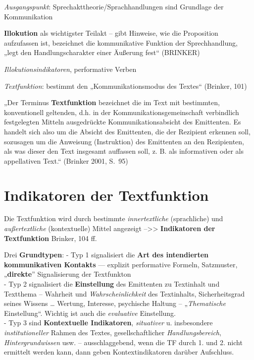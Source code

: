 \documentclass[
  letterpaper,
]{scrbook}
\begin{document}
\emph{Ausgangspunkt}: Sprechakttheorie/Sprachhandlungen sind Grundlage
der Kommunikation

\textbf{Illokution} als wichtigster Teilakt -- gibt Hinweise, wie die
Proposition aufzufassen ist, bezeichnet die kommunikative Funktion der
Sprechhandlung, „legt den Handlungscharakter einer Äußerung fest``
(BRINKER)

\emph{Illokutionsindikatoren}, performative Verben

\emph{Textfunktion}: bestimmt den „Kommunikationsmodus des Textes``
(Brinker, 101)

„Der Terminus \textbf{Textfunktion} bezeichnet die im Text mit
bestimmten, konventionell geltenden, d.h. in der
Kommunikationsgemeinschaft verbindlich festgelegten Mitteln ausgedrückte
Kommunikationsabsicht des Emittenten. Es handelt sich also um die
Absicht des Emittenten, die der Rezipient erkennen soll, sozusagen um
die Anweisung (Instruktion) des Emittenten an den Rezipienten, als was
dieser den Text insgesamt auffassen soll, z. B. als informativen oder
als appellativen Text.`` (Brinker 2001, S.~95)

\hypertarget{indikatoren-der-textfunktion}{%
\section{Indikatoren der
Textfunktion}\label{indikatoren-der-textfunktion}}

Die Textfunktion wird durch bestimmte \emph{innertextliche}
(sprachliche) und \emph{außertextliche} (kontextuelle) Mittel angezeigt
--\textgreater\textgreater{} \textbf{Indikatoren der Textfunktion}
Brinker, 104 ff.

Drei \textbf{Grundtypen}: - Typ 1 signalisiert die \textbf{Art des
intendierten kommunikativen Kontakts} --- explizit performative Formeln,
Satzmuster, „\textbf{direkte}'' Signalisierung der Textfunkton\\
- Typ 2 signalisiert die \textbf{Einstellung} des Emittenten zu
Textinhalt und Textthema -- Wahrheit und \emph{Wahrscheinlichkeit} des
Textinhalts, Sicherheitsgrad seines Wissens \ldots{} Wertung, Interesse,
psychische Haltung -- „\emph{Thematische} Einstellung``. Wichtig ist
auch die \emph{evaluative} Einstellung.\\
- Typ 3 sind \textbf{Kontextuelle Indikatoren}, \emph{situativer} u.
insbesondere \emph{institutioneller} Rahmen des Textes,
gesellschaftlicher \emph{Handlungsbereich}, \emph{Hintergrundwissen}
usw. -- ausschlaggebend, wenn die TF durch 1. und 2. nicht ermittelt
werden kann, dann geben Kontextindikatoren darüber Aufschluss.\\
\end{document}
